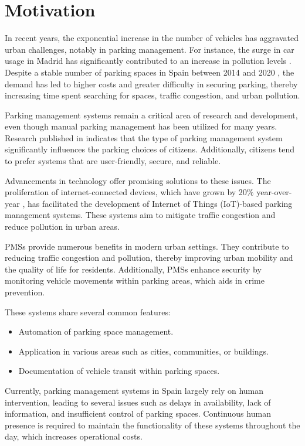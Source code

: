 \chapter{Motivation}\label{ch:motivation}

In recent years, the exponential increase in the number of vehicles has aggravated urban challenges, notably in parking management. For instance, the surge in car usage in Madrid has significantly contributed to an increase in pollution levels \autocite{environmental_imapct_madrid_central}. Despite a stable number of parking spaces in Spain between 2014 and 2020 \autocite{urban_mobility_trends}, the demand has led to higher costs and greater difficulty in securing parking, thereby increasing time spent searching for spaces, traffic congestion, and urban pollution.

Parking management systems remain a critical area of research and development, even though manual parking management has been utilized for many years. Research published in \autocite{parking_choices} indicates that the type of parking management system significantly influences the parking choices of citizens. Additionally, citizens tend to prefer systems that are user-friendly, secure, and reliable.

Advancements in technology offer promising solutions to these issues. The proliferation of internet-connected devices, which have grown by 20\% year-over-year \autocite{iot_growth}, has facilitated the development of Internet of Things (IoT)-based parking management systems. These systems aim to mitigate traffic congestion and reduce pollution in urban areas.

PMSs provide numerous benefits in modern urban settings. They contribute to reducing traffic congestion and pollution, thereby improving urban mobility and the quality of life for residents. Additionally, PMSs enhance security by monitoring vehicle movements within parking areas, which aids in crime prevention.

These systems share several common features:
\begin{itemize}
\item Automation of parking space management.
\item Application in various areas such as cities, communities, or buildings.
\item Documentation of vehicle transit within parking spaces.
\end{itemize}

Currently, parking management systems in Spain largely rely on human intervention, leading to several issues such as delays in availability, lack of information, and insufficient control of parking spaces. Continuous human presence is required to maintain the functionality of these systems throughout the day, which increases operational costs.

